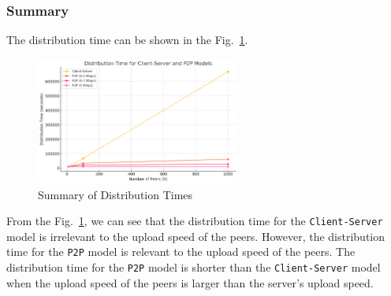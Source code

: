 \documentclass{cshwk}
\begin{document}
\subsubsection*{Summary}

The distribution time can be shown in the Fig.~\ref{fig:summary}.
\begin{figure}[H]
    \centering
    \includegraphics[width=0.6\textwidth]{hw2-4-3.png}
    \caption{Summary of Distribution Times}
    \label{fig:summary}
\end{figure}

From the Fig.~\ref{fig:summary}, we can see that the distribution time for the \texttt{Client-Server} model is irrelevant to the upload speed of the peers. However, the distribution time for the \texttt{P2P} model is relevant to the upload speed of the peers. The distribution time for the \texttt{P2P} model is shorter than the \texttt{Client-Server} model when the upload speed of the peers is larger than the server's upload speed.
\end{document}
